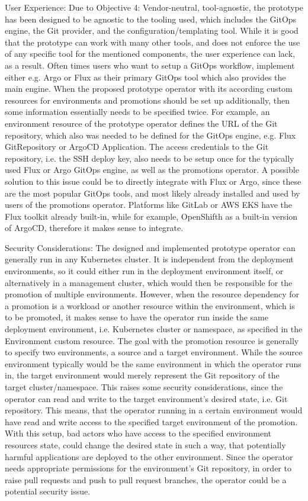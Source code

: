 User Experience:
Due to Objective 4: Vendor-neutral, tool-agnostic,
the prototype has been designed to be agnostic to the tooling used, which includes the GitOps engine, the Git provider, and the configuration/templating tool.
While it is good that the prototype can work with many other tools,
and does not enforce the use of any specific tool for the mentioned components,
the user experience can lack, as a result.
%
Often times users who want to setup a GitOps workflow,
implement either e.g. Argo or Flux as their primary GitOps tool which also provides the main engine.
When the proposed prototype operator with its according custom resources for environments and promotions
should be set up additionally,
then some information essentially needs to be specified twice. For example,
an environment resource of the prototype operator defines the URL of the Git repository,
which also was needed to be defined for the GitOps engine, e.g. Flux GitRepository or ArgoCD Application.
%
The access credentials to the Git repository, i.e. the SSH deploy key,
also needs to be setup once for the typically used Flux or Argo GitOps engine,
as well as the promotions operator.
%
A possible solution to this issue could be to directly integrate with Flux or Argo, since these are the most popular GitOps tools, and most likely already installed and used by users of the promotions operator.
Platforms like GitLab or AWS EKS have the Flux toolkit already built-in,
while for example, OpenShifth as a built-in version of ArgoCD,
therefore it makes sense to integrate.

Security Considerations:
The designed and implemented prototype operator can generally run in any Kubernetes cluster.
It is independent from the deployment environments, so it could either run in the deployment environment itself,
or alternatively in a management cluster, which would then be responsible for the promotion of multiple environments.
However, when the resource dependency for a promotion is a workload or another resource within the environment,
which is to be promoted, it makes sense to have the operator run inside the same deployment environment, i.e. Kubernetes cluster or namespace, as specified in the Environment custom resource.
%
The goal with the promotion resource is generally to specify two environments,
a source and a target environment.
While the source environment typically would be the same environment in which the operator runs in,
the target environment would merely represent the Git repository of the target cluster/namespace.
This raises some security considerations,
since the operator can read and write to the target environment's desired state, i.e. Git repository.
This means, that the operator running in a certain environment would have read and write access
to the specified target environment of the promotion.
With this setup, bad actors who have access to the specified environment resources state,
could change the desired state in such a way, that
potentially harmful applications are deployed to the other environment.
Since the operator needs appropriate permissions for the environment's Git repository,
in order to raise pull requests and push to pull request branches, the operator could
be a potential security issue.

